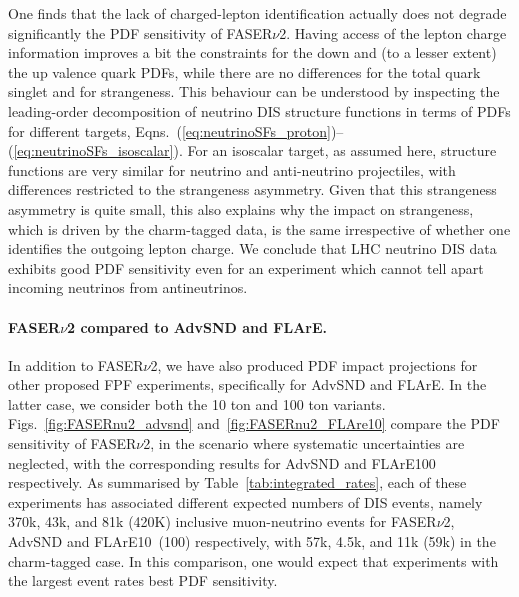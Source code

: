 One finds that the lack of charged-lepton identification actually does not degrade significantly the PDF
sensitivity of FASER$\nu$2.
%
Having access of the lepton charge information improves a bit the constraints for the down and (to a lesser
extent) the up valence quark PDFs,  while there are no differences for the total quark
singlet and for strangeness.
%
This behaviour can be understood by inspecting the leading-order decomposition of neutrino DIS
structure functions in terms of PDFs for different targets, Eqns.~(\ref{eq:neutrinoSFs_proton})--(\ref{eq:neutrinoSFs_isoscalar}).
%
For an isoscalar target, as assumed here, structure functions are very similar for neutrino
and anti-neutrino projectiles, with differences restricted to the strangeness asymmetry.
%
Given that this strangeness asymmetry is quite small, this also explains why the impact
on strangeness, which is driven by the charm-tagged data, is the same irrespective of whether one identifies
the outgoing lepton charge.
%
We conclude that LHC neutrino DIS data exhibits good PDF sensitivity even for an experiment which cannot tell
apart incoming neutrinos from antineutrinos.

\paragraph{FASER$\nu$2 compared to AdvSND and FLArE.}
%
In addition to FASER$\nu$2, we have also produced PDF impact projections for
other proposed FPF experiments, specifically for AdvSND and FLArE.
%
In the latter case, we consider both the 10 ton and 100 ton variants.
%
Figs.~\ref{fig:FASERnu2_advsnd} and~\ref{fig:FASERnu2_FLAre10} compare the PDF sensitivity
of FASER$\nu$2, in the scenario where systematic uncertainties are neglected, with the corresponding
results for AdvSND and FLArE100 respectively.
%
As summarised by Table~\ref{tab:integrated_rates}, each of these experiments
has associated different expected numbers of DIS events, namely 370k, 43k, and 81k (420K)
inclusive muon-neutrino events for FASER$\nu$2, AdvSND and FLArE10~(100) respectively,
with 57k, 4.5k, and 11k (59k) in the charm-tagged case.
%
In this comparison, one would expect that experiments with the largest event rates best PDF sensitivity.

